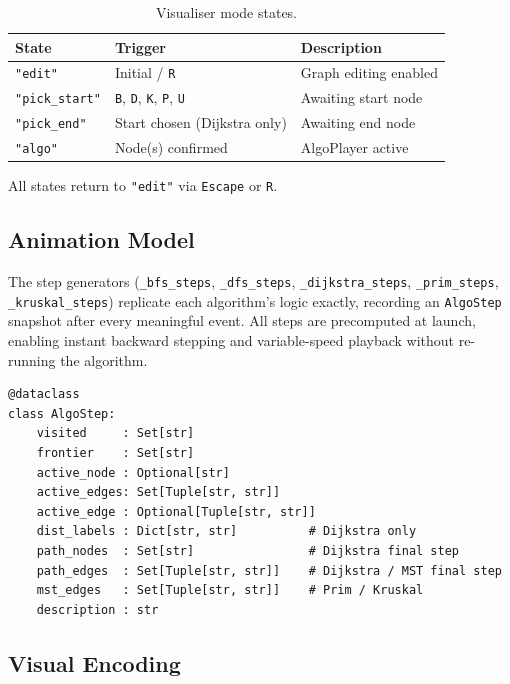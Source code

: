 \documentclass[12pt, a4paper]{article}
\begin{document}
\begin{table}[H]
\centering
\caption{Visualiser mode states.}
\begin{tabular}{@{}lll@{}}
\toprule
\textbf{State} & \textbf{Trigger} & \textbf{Description} \\
\midrule
\texttt{"edit"}        & Initial / \texttt{R}                        & Graph editing enabled \\
\texttt{"pick\_start"} & \texttt{B}, \texttt{D}, \texttt{K}, \texttt{P}, \texttt{U} & Awaiting start node \\
\texttt{"pick\_end"}   & Start chosen (Dijkstra only)                & Awaiting end node \\
\texttt{"algo"}        & Node(s) confirmed                           & AlgoPlayer active \\
\bottomrule
\end{tabular}
\end{table}

All states return to \texttt{"edit"} via \texttt{Escape} or \texttt{R}.

\subsection{Animation Model}

The step generators (\texttt{\_bfs\_steps}, \texttt{\_dfs\_steps},
\texttt{\_dijkstra\_steps}, \texttt{\_prim\_steps},
\texttt{\_kruskal\_steps}) replicate each algorithm's logic exactly,
recording an \texttt{AlgoStep} snapshot after every meaningful event.
All steps are precomputed at launch, enabling instant backward stepping
and variable-speed playback without re-running the algorithm.

\begin{lstlisting}[caption={\texttt{AlgoStep} dataclass.}]
@dataclass
class AlgoStep:
    visited     : Set[str]
    frontier    : Set[str]
    active_node : Optional[str]
    active_edges: Set[Tuple[str, str]]
    active_edge : Optional[Tuple[str, str]]
    dist_labels : Dict[str, str]          # Dijkstra only
    path_nodes  : Set[str]                # Dijkstra final step
    path_edges  : Set[Tuple[str, str]]    # Dijkstra / MST final step
    mst_edges   : Set[Tuple[str, str]]    # Prim / Kruskal
    description : str
\end{lstlisting}

\subsection{Visual Encoding}
\end{document}
